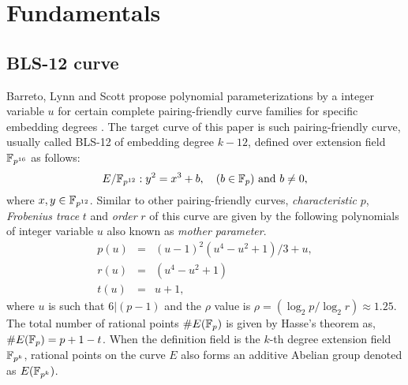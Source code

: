 \section{Fundamentals}
\subsection{BLS-12 curve}
Barreto, Lynn and Scott propose polynomial parameterizations by a integer variable $u$ for certain complete pairing-friendly curve families for specific embedding degrees \cite{bls}. The target curve of this paper is such pairing-friendly curve, usually called BLS-12 of embedding degree $k-12$, defined over extension field $\mathbb{F}_{p^{16}}$ as follows:
\begin{equation}\label{eq:KSS_16}
E/\mathbb{F}_{p^{12}}:y^2=x^3+b, \quad \mbox{($b \in {\mathbb{F}}_{p}$) and  $b \neq 0$},
\end{equation}
 where $x,y \in \mathbb{F}_{p^{12}}$. Similar to other pairing-friendly curves,  \textit{characteristic} $p$, \textit{Frobenius trace} $t$ and \textit{order} $r$ of this curve are given by the following polynomials of  integer variable $u$ also known as \textit{mother parameter}.
\begin{subequations}
\begin{eqnarray}
p(u) &= & (u-1)^2(u^4-u^2+1)/3+u,  \\\label{eq:kss_16_char}
r(u) &= & (u^4-u^2+1)\label{eq:kss_16_degree}  \\
t(u) &=& u+1, \label{eq:kss_16_trace} 
\end{eqnarray}
\end{subequations} 
where $u$ is such that $6|(p-1)$ and the $\rho$ value is $\rho = (\log_2 p/\log_2 r) \approx 1.25$. 
The total number of rational points $\#E({\mathbb{F}}_{p})$ is given by Hasse's theorem as, $\#E({\mathbb{F}}_{p}) = p+1-t$. 
When the definition field is the $k$-th degree extension field $\mathbb{F}_{p^k}$, rational points on the curve $E$ also forms an additive Abelian group denoted as $E(\mathbb{F}_{p^k})$.

